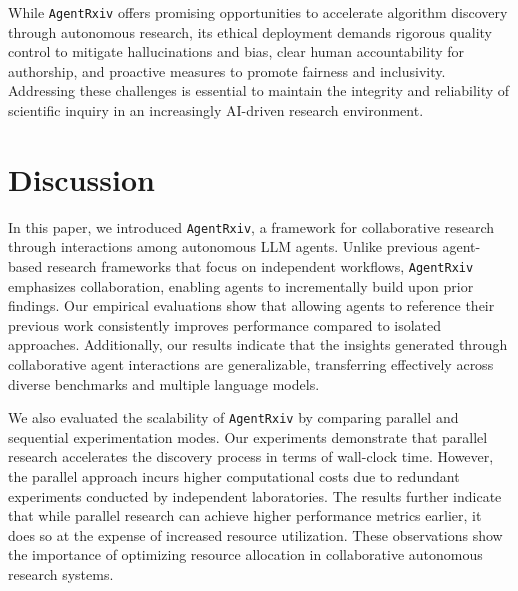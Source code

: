 \documentclass[11pt, a4paper]{include/gdm_format}
\begin{document}
While \texttt{AgentRxiv} offers promising opportunities to accelerate algorithm discovery through autonomous research, its ethical deployment demands rigorous quality control to mitigate hallucinations and bias, clear human accountability for authorship, and proactive measures to promote fairness and inclusivity. Addressing these challenges is essential to maintain the integrity and reliability of scientific inquiry in an increasingly AI-driven research environment.

\section{Discussion}


In this paper, we introduced \texttt{AgentRxiv}, a framework for collaborative research through interactions among autonomous LLM agents. Unlike previous agent-based research frameworks that focus on independent workflows, \texttt{AgentRxiv} emphasizes collaboration, enabling agents to incrementally build upon prior findings. Our empirical evaluations show that allowing agents to reference their previous work consistently improves performance compared to isolated approaches.  Additionally, our results indicate that the insights generated through collaborative agent interactions are generalizable, transferring effectively across diverse benchmarks and multiple language models. 

We also evaluated the scalability of \texttt{AgentRxiv} by comparing parallel and sequential experimentation modes. Our experiments demonstrate that parallel research accelerates the discovery process in terms of wall-clock time. However, the parallel approach incurs higher computational costs due to redundant experiments conducted by independent laboratories. The results further indicate that while parallel research can achieve higher performance metrics earlier, it does so at the expense of increased resource utilization. These observations show the importance of optimizing resource allocation in collaborative autonomous research systems.
\end{document}
